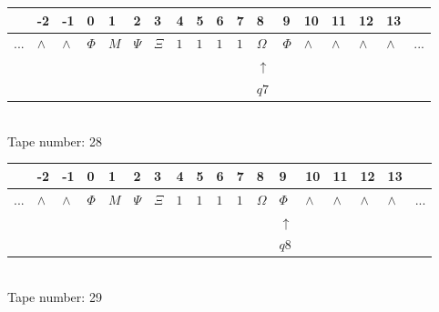 \documentclass[11pt]{article}
\begin{document}
\begin{table}[H]
\centering
\begin{tabular}{llllllllllllllllll}
 & -2 & -1 & 0 & 1 & 2 & 3 & 4 & 5 & 6 & 7 & 8 & 9 & 10 & 11 & 12 & 13 & \\
\hline
$...$ & \multicolumn{1}{|l|}{$\wedge$} & \multicolumn{1}{|l|}{$\wedge$} & \multicolumn{1}{|l|}{$\Phi$} & \multicolumn{1}{|l|}{$M$} & \multicolumn{1}{|l|}{$\Psi$} & \multicolumn{1}{|l|}{$\Xi$} & \multicolumn{1}{|l|}{$1$} & \multicolumn{1}{|l|}{$1$} & \multicolumn{1}{|l|}{$1$} & \multicolumn{1}{|l|}{$1$} & \multicolumn{1}{|l|}{$\Omega$} & \multicolumn{1}{|l|}{$\Phi$} & \multicolumn{1}{|l|}{$\wedge$} & \multicolumn{1}{|l|}{$\wedge$} & \multicolumn{1}{|l|}{$\wedge$} & \multicolumn{1}{|l|}{$\wedge$} & $...$\\
\hline
&  &  &  &  &  &  &  &  &  &  & $\uparrow$ &  &  &  &  &  &  \\
&  &  &  &  &  &  &  &  &  &  & $ q7 $ &  &  &  &  &  &  \\
\end{tabular}
\\
Tape number: 28
\noindent\makebox[\linewidth]{\hdashrule{\textwidth}{1pt}{1pt}}\end{table}

\begin{table}[H]
\centering
\begin{tabular}{llllllllllllllllll}
 & -2 & -1 & 0 & 1 & 2 & 3 & 4 & 5 & 6 & 7 & 8 & 9 & 10 & 11 & 12 & 13 & \\
\hline
$...$ & \multicolumn{1}{|l|}{$\wedge$} & \multicolumn{1}{|l|}{$\wedge$} & \multicolumn{1}{|l|}{$\Phi$} & \multicolumn{1}{|l|}{$M$} & \multicolumn{1}{|l|}{$\Psi$} & \multicolumn{1}{|l|}{$\Xi$} & \multicolumn{1}{|l|}{$1$} & \multicolumn{1}{|l|}{$1$} & \multicolumn{1}{|l|}{$1$} & \multicolumn{1}{|l|}{$1$} & \multicolumn{1}{|l|}{$\Omega$} & \multicolumn{1}{|l|}{$\Phi$} & \multicolumn{1}{|l|}{$\wedge$} & \multicolumn{1}{|l|}{$\wedge$} & \multicolumn{1}{|l|}{$\wedge$} & \multicolumn{1}{|l|}{$\wedge$} & $...$\\
\hline
&  &  &  &  &  &  &  &  &  &  &  & $\uparrow$ &  &  &  &  &  \\
&  &  &  &  &  &  &  &  &  &  &  & $ q8 $ &  &  &  &  &  \\
\end{tabular}
\\
Tape number: 29
\noindent\makebox[\linewidth]{\hdashrule{\textwidth}{1pt}{1pt}}\end{table}
\clearpage
\end{document}
